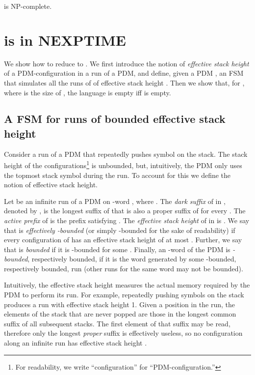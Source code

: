 \documentclass{llncs}
\begin{document}
\begin{theorem}
\label{th:pdafsa}
 is NP-complete.
\end{theorem}




\makeatletter{}

\section{ is in NEXPTIME}
\label{sec:pdapda}

We show how to reduce  to
.
We first introduce the notion of {\em effective stack height} of a 
PDM-configuration in a run of a PDM, and define, given a PDM ,  
an FSM  that simulates all the runs of  of effective stack height .
Then we show that, for , where  is the size of ,
the language  is
empty if{}f  
is empty. 


\subsection{A FSM for runs of bounded effective stack height}

Consider a run of a PDM that repeatedly pushes symbol on the
stack. The stack height of the configurations\footnote{
For readability, we write ``configuration'' for ``PDM-configuration.''
}
 is unbounded, but,
intuitively, the PDM only uses the topmost stack symbol during
the run. To account for this we define the notion of effective stack height.

\begin{definition}
  Let  be an infinite run of a
  PDM on -word , where . 
The {\em dark suffix} of  in , denoted by , is
  the longest suffix of  that is also a proper suffix of  for
  every . The {\em active prefix}  of  is the
  prefix satisfying .
The {\em effective stack height} of  in  is 
	.
We say that  is {\em effectively -bounded} (or simply -bounded
	for the sake of readability) if every configuration of  has an
	effective stack height of at most . 
Further, we say that  is {\em bounded} if it is -bounded for some .  Finally, an -word of the PDM is {\em -bounded},
	respectively bounded, if it is the word generated by some -bounded,
	respectively bounded, run (other runs for the same word may not be bounded).
\end{definition}

Intuitively, the effective stack height measures the actual memory required by
the PDM to perform its run. 
For example, repeatedly pushing symbols on the stack produces a run with
effective stack height 1.  
Given a position in the run, the elements of the stack that are never popped
are those in the longest common suffix of all subsequent stacks.
The first element of that suffix may be read, therefore only the
longest \emph{proper} suffix is effectively useless, so  
no configuration along an infinite run has effective stack height . 
\end{document}

